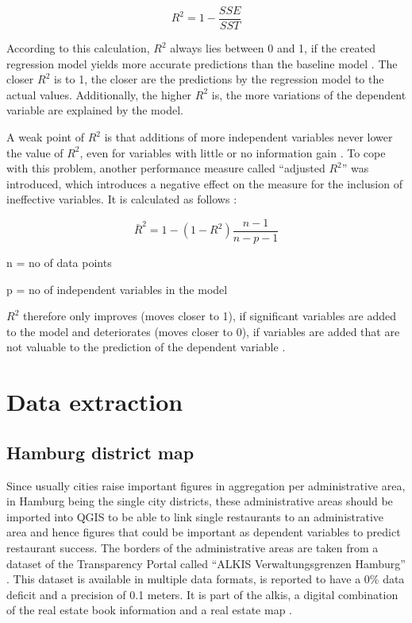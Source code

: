 \documentclass[a4paper, 11pt, oneside]{Thesis}  %
\begin{document}
\[ R^2 = 1 - \frac{SSE}{SST}\]

According to this calculation, $R^2$ always lies between 0 and 1, if the created regression model yields more accurate predictions than the baseline model \cite{Devasthali.2018}. The closer $R^2$ is to 1, the closer are the predictions by the regression model to the actual values. Additionally, the higher $R^2$ is, the more variations of the dependent variable are explained by the model.

A weak point of $R^2$ is that additions of more independent variables never lower the value of $R^2$, even for variables with little or no information gain \cite{Devasthali.2018}. To cope with this problem, another performance measure called ``adjusted $R^2$'' was introduced, which introduces a negative effect on the measure for the inclusion of ineffective variables. It is calculated as follows \cite{Devasthali.2018}:

\[ \bar{R}^2 = 1 - (1-R^2)\frac{n-1}{n-p-1}\]

n = no of data points

p = no of independent variables in the model

$R^2$ therefore only improves (moves closer to 1), if significant variables are added to the model and deteriorates (moves closer to 0), if variables are added that are not valuable to the prediction of the dependent variable \cite{Devasthali.2018}. 

\chapter{Data extraction}
\label{Data extraction}

\section{Hamburg district map}

Since usually cities raise important figures in aggregation per administrative area, in Hamburg being the single city districts, these administrative areas should be imported into QGIS to be able to link single restaurants to an administrative area and hence figures that could be important as dependent variables to predict restaurant success. The borders of the administrative areas are taken from a dataset of the Transparency Portal called ``ALKIS Verwaltungsgrenzen Hamburg'' \cite{LandesbetriebGeoinformationundVermessung.28.02.2018}. This dataset is available in multiple data formats, is reported to have a 0\% data deficit and a precision of 0.1 meters. It is part of the \ac{alkis}, a digital combination of the real estate book information and a real estate map \cite{ALKIS2019}.
\end{document}
